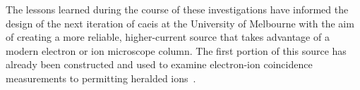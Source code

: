 The lessons learned during the course of these investigations have informed the design of the next iteration of \gls{caeis} at the University of Melbourne with the aim of creating a more reliable, higher-current source that takes advantage of a modern electron or ion microscope column.
The first portion of this source has already been constructed and used to examine electron-ion coincidence measurements to permitting heralded ions~\cite{mcculloch_heralded_2018}.
